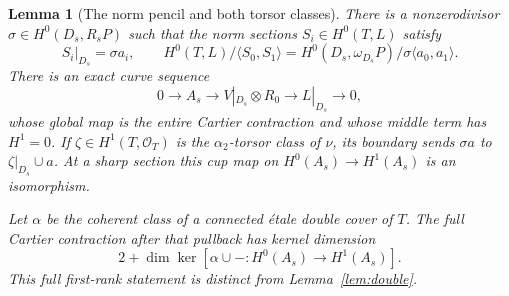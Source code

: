 \documentclass[11pt]{article}
\newtheorem{lemma}[theorem]{Lemma}
\theoremstyle{definition}\newtheorem{definition}[theorem]{Definition}
\theoremstyle{remark}\newtheorem{remark}[theorem]{Remark}
\newcommand{\OO}{\mathcal O}
\begin{document}
\begin{lemma}[The norm pencil and both torsor classes]\label{lem:norm-pencil}
There is a nonzerodivisor $\sigma\in H^0(D_s,R_sP)$ such that the norm sections $S_i\in H^0(T,L)$ satisfy
\[
 S_i|_{D_s}=\sigma a_i,\qquad
 H^0(T,L)/\langle S_0,S_1\rangle
  =H^0(D_s,\omega_{D_s}P)/\sigma\langle a_0,a_1\rangle.       \tag{C5}
\]
There is an exact curve sequence
\[
 0\to A_s\to V|_{D_s}\otimes R_0\to L|_{D_s}\to0,            \tag{C6}
\]
whose global map is the entire Cartier contraction and whose middle term has $H^1=0$. If $\zeta\in H^1(T,\OO_T)$ is the $\alpha _2$-torsor class of $\nu$, its boundary sends $\sigma a$ to $\zeta|_{D_s}\cup a$. At a sharp section this cup map on $H^0(A_s)\to H^1(A_s)$ is an isomorphism.

Let $\alpha$ be the coherent class of a connected \'etale double cover of $T$. The full Cartier contraction after that pullback has kernel dimension
\[
       2+\dim\ker[\alpha\cup-:H^0(A_s)\to H^1(A_s)].         \tag{C7}
\]
This full first-rank statement is distinct from Lemma~\ref{lem:double}.
\end{lemma}
\end{document}
